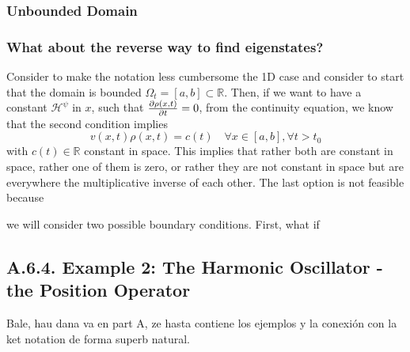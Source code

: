 \documentclass[11pt, a4paper]{article} %
\newcommand{\R}{\mathbb{R}} %
\newcommand{\h}{\mathcal{H}}
\begin{document}
\subsubsection*{Unbounded Domain}



\subsubsection*{What about the reverse way to find eigenstates?}

Consider to make the notation less cumbersome the 1D case and consider to start that the domain is bounded $\Omega_t=[a,b]\subset \R$. Then, if we want to have a constant $\h^\psi$ in $x$, such that $\pdv{\rho(x,t)}{t}=0$, from the continuity equation, we know that the second condition implies
\begin{equation}
v(x,t)\rho(x,t)=c(t) \quad \forall x\in[a,b], \forall t>t_0
\end{equation}
with $c(t)\in\R$ constant in space. This implies that rather both are constant in space, rather one of them is zero, or rather they are not constant in space but are everywhere the multiplicative inverse of each other. The last option is not feasible because 

we will consider two possible boundary conditions. First, what if  

\subsection*{A.6.4. Example 2: The Harmonic Oscillator - the Position Operator}


Bale, hau dana va en part A, ze hasta contiene los ejemplos y la conexión con la ket notation de forma superb natural.
\end{document}
